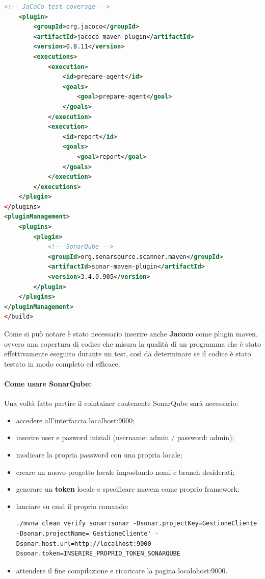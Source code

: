 \begin{lstlisting}[language=XML, caption={Implementazioni pom.xml}]
    <!-- JaCoCo test coverage -->
    <plugin>
        <groupId>org.jacoco</groupId>
        <artifactId>jacoco-maven-plugin</artifactId>
        <version>0.8.11</version>
        <executions>
            <execution>
                <id>prepare-agent</id>
                <goals>
                    <goal>prepare-agent</goal>
                </goals>
            </execution>
            <execution>
                <id>report</id>
                <goals>
                    <goal>report</goal>
                </goals>
            </execution>
        </executions>
    </plugin>
</plugins>
<pluginManagement>
    <plugins>
        <plugin>
            <!-- SonarQube -->
            <groupId>org.sonarsource.scanner.maven</groupId>
            <artifactId>sonar-maven-plugin</artifactId>
            <version>3.4.0.905</version>
        </plugin>
    </plugins>
</pluginManagement>
</build>
\end{lstlisting}

Come si può notare è stato necessario inserire anche \textbf{Jacoco}\cite{Jacoco} come plugin maven, ovvero una copertura di codice che misura la qualità di un programma che è stato effettivamente eseguito durante un test, così da determinare se il codice è stato testato in modo completo ed efficace.

\paragraph{Come usare SonarQube:}

Una voltà fatto partire il cointainer contenente SonarQube sarà necessario:

\begin{itemize}
 \item accedere all'interfaccia localhost:9000;
 \item inserire user e pasword iniziali (username: admin / password: admin);
 \item modicare la propria password con una propria locale;
 \item creare un nuovo progetto locale impostando nomi e branch desiderati;
 \item generare un \textbf{token} locale e specificare mavem come proprio framework;
 \item lanciare su cmd il proprio comando:
\begin{lstlisting}[style=terminal, 
	caption={Avvio sonarqube}]
    ./mvnw clean verify sonar:sonar -Dsonar.projectKey=GestioneCliente -Dsonar.projectName='GestioneCliente' -Dsonar.host.url=http://localhost:9000 -Dsonar.token=INSERIRE_PROPRIO_TOKEN_SONARQUBE
\end{lstlisting}
\item attendere il fine compilazione e ricaricare la pagina localohost:9000.
\end{itemize}

